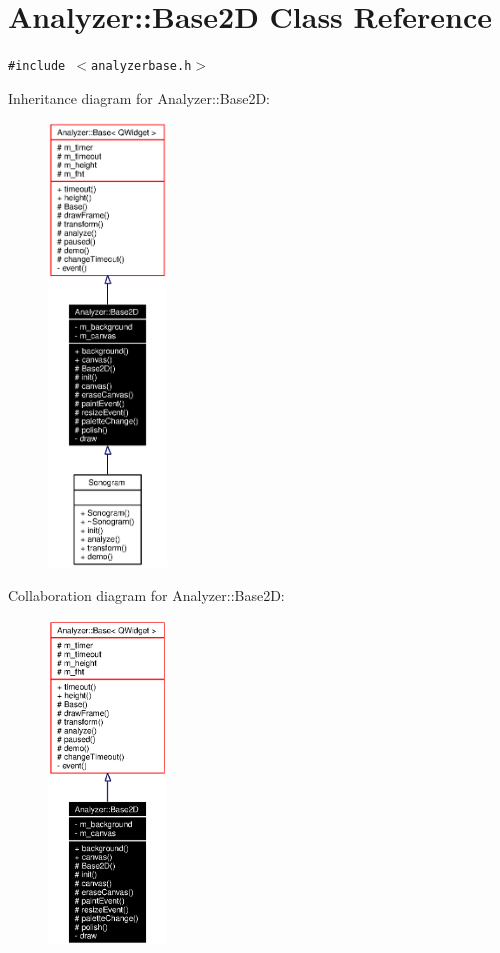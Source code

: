 \section{Analyzer::Base2D Class Reference}
\label{classAnalyzer_1_1Base2D}
{\tt \#include $<$analyzerbase.h$>$}

Inheritance diagram for Analyzer::Base2D:\begin{figure}[H]
\begin{center}
\leavevmode
\includegraphics[width=89pt]{classAnalyzer_1_1Base2D__inherit__graph}
\end{center}
\end{figure}
Collaboration diagram for Analyzer::Base2D:\begin{figure}[H]
\begin{center}
\leavevmode
\includegraphics[width=89pt]{classAnalyzer_1_1Base2D__coll__graph}
\end{center}
\end{figure}
